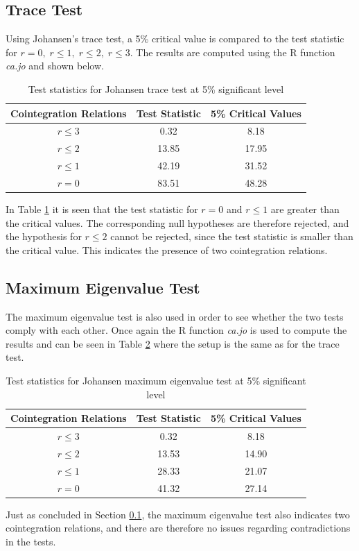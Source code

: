\subsection{Trace Test}\label{subsec:johansen_trace}
Using Johansen's trace test, a 5\% critical value is compared to the test statistic for $r=0,\;r\leq1,\;r\leq 2,\;r\leq3$.
The results are computed using the R function \textit{ca.jo} and shown below.
\begin{table}[H]
\centering
\begin{tabular}{|c|c|c|}
\hline
\textbf{Cointegration Relations} & \textbf{Test Statistic} & \textbf{5\% Critical Values} \\ \hline
$r \leq 3$ & 0.32  & 8.18  \\ \hline
$r \leq 2$ & 13.85 & 17.95 \\ \hline
$r \leq 1$ & 42.19 & 31.52 \\ \hline
$r = 0$    & 83.51 & 48.28 \\ \hline
\end{tabular}
\caption{Test statistics for Johansen trace test at 5\% significant level}
\label{tab:traceresults}
\end{table}
\noindent In Table \ref{tab:traceresults} it is seen that the test statistic for $r=0$ and $r\leq1$ are greater than the critical values. The corresponding null hypotheses are therefore rejected, and the hypothesis for $r\leq2$ cannot be rejected, since the test statistic is smaller than the critical value. This indicates the presence of two cointegration relations.

\subsection{Maximum Eigenvalue Test}
The maximum eigenvalue test is also used in order to see whether the two tests comply with each other. Once again the R function \textit{ca.jo} is used to compute the results and can be seen in Table \ref{tab:maximal_eigenvalue} where the setup is the same as for the trace test.
\begin{table}[H]
\centering
\begin{tabular}{|c|c|c|}
\hline
\textbf{Cointegration Relations} & \textbf{Test Statistic} & \textbf{5\% Critical Values} \\ \hline
$r \leq 3$ & 0.32  & 8.18  \\ \hline
$r \leq 2$ & 13.53 & 14.90 \\ \hline
$r \leq 1$ & 28.33 & 21.07 \\ \hline
$r = 0$    & 41.32 & 27.14 \\ \hline
\end{tabular}
\caption{Test statistics for Johansen maximum eigenvalue test at 5\% significant level}
\label{tab:maximal_eigenvalue}
\end{table}
\noindent Just as concluded in Section \ref{subsec:johansen_trace}, the maximum eigenvalue test also indicates two cointegration relations, and there are therefore no issues regarding contradictions in the tests.

